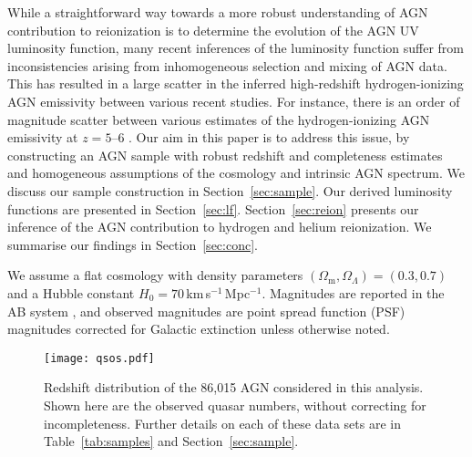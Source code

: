 \documentclass[fleqn,usenatbib]{mnras}
\begin{document}
While a straightforward way towards a more robust understanding of AGN
contribution to reionization is to determine the evolution of the AGN
UV luminosity function, many recent inferences of the luminosity
function suffer from inconsistencies arising from inhomogeneous
selection and mixing of AGN data.  This has resulted in a large
scatter in the inferred high-redshift hydrogen-ionizing AGN emissivity
between various recent studies.  For instance, there is an order of
magnitude scatter between various estimates of the hydrogen-ionizing
AGN emissivity at $z=5$--$6$ \citep{2011ApJ...728L..26G,
  2012ApJ...755..169M, 2015AA...578A..83G, 2018PASJ...70S..34A,
  2018AJ....155..131M, 2018MNRAS.474.2904P, 2017ApJ...847L..15O,
  2017MNRAS.466.1160M}.  Our aim in this paper is to address this
issue, by constructing an AGN sample with robust redshift and
completeness estimates and homogeneous assumptions of the cosmology
and intrinsic AGN spectrum.  We discuss our sample construction in
Section~\ref{sec:sample}.  Our derived luminosity functions are
presented in Section~\ref{sec:lf}.  Section~\ref{sec:reion} presents
our inference of the AGN contribution to hydrogen and helium
reionization.  We summarise our findings in Section~\ref{sec:conc}.

We assume a flat cosmology with density parameters
$\left(\Omega_\mathrm{m},\Omega_\Lambda\right)=\left(0.3,0.7\right)$
and a Hubble constant $H_0=70$\,km\,s$^{-1}$\,Mpc$^{-1}$. Magnitudes
are reported in the AB system \citep{1983ApJ...266..713O}, and
observed magnitudes are point spread function (PSF) magnitudes
\citep{2002AJ....123..485S} corrected for Galactic extinction
\citep{1998ApJ...500..525S} unless otherwise noted.

\begin{figure*}
  \begin{center}
    \texttt{[image: qsos.pdf]}
  \end{center}
  \caption{Redshift distribution of the 86,015 AGN considered in this
    analysis.  Shown here are the observed quasar numbers, without
    correcting for incompleteness.  Further details on each of these
    data sets are in Table~\ref{tab:samples} and
    Section~\ref{sec:sample}.}
  \label{fig:qsos}
\end{figure*}
\end{document}
